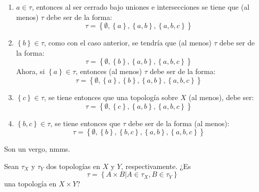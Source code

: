 \documentclass[12pt]{report}
\theoremstyle{largebreak}
\begin{document}
\begin{sol}
        \begin{enumerate}
            \item ${a}\in\tau$, entonces al ser cerrado bajo uniones e intersecciones se tiene que (al menos) $\tau$ debe ser de la forma:
            \begin{equation*}
                \tau=\left\{\emptyset,\left\{a\right\},\left\{a,b\right\},\left\{a,b,c\right\}\right\}
            \end{equation*}
            \item $\left\{b\right\}\in\tau$, como con el caso anterior, se tendría que (al menos) $\tau$ debe ser de la forma:
            \begin{equation*}
                \tau=\left\{\emptyset,\left\{b\right\},\left\{a,b\right\},\left\{a,b,c\right\}\right\}
            \end{equation*}
            Ahora, si $\left\{a\right\}\in\tau$, entonces (al menos) $\tau$ debe ser de la forma:
            \begin{equation*}
                \tau=\left\{\emptyset,\left\{a\right\},\left\{b\right\},\left\{a,b\right\},\left\{a,b,c\right\}\right\}
            \end{equation*}
            \item $\left\{c\right\}\in\tau$, se tiene entonces que una topología sobre $X$ (al menos), debe ser:
            \begin{equation*}
                \tau=\left\{\emptyset,\left\{c\right\},\left\{a,b\right\},\left\{a,b,c\right\} \right\}
            \end{equation*}
            \item $\left\{b,c\right\}\in\tau$, se tiene entonces que $\tau$ debe ser de la forma (al menos):
            \begin{equation*}
                \tau=\left\{\emptyset,\left\{b\right\},\left\{b,c\right\},\left\{a,b\right\},\left\{a,b,c\right\} \right\}
            \end{equation*}
        \end{enumerate}
        Son un vergo, nmms.
    \end{sol}

    \begin{excer}
        Sean $\tau_X$ y $\tau_Y$ dos topologías en $X$ y $Y$, respectivamente. ¿Es
        \begin{equation*}
            \tau=\left\{A\times B\big| A\in\tau_X, B\in\tau_Y \right\}
        \end{equation*}
        una topología en $X\times Y$?
    \end{excer}
\end{document}
